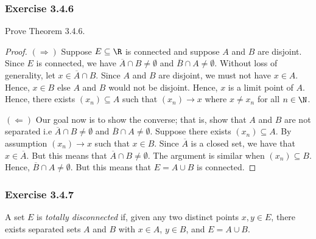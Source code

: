 \subsubsection{Exercise 3.4.6} Prove Theorem 3.4.6.
\begin{proof}
    \( (\Rightarrow) \) Suppose \( E \subseteq \R  \) is connected and suppose \( A  \) and \( B \) are disjoint. Since \( E  \) is connected, we have \( \overline{A} \cap B \neq \emptyset \) and \( \overline{B} \cap A \neq \emptyset \). Without loss of generality, let \( x \in \overline{A}  \cap B  \). Since \( A  \) and \( B  \) are disjoint, we must not have \( x \in A   \). Hence, \( x \in B  \) else \( A  \) and \( B  \) would not be disjoint. Hence, \( x  \) is a limit point of \( A  \). Hence, there exists \( (x_n) \subseteq A  \) such that \( (x_n) \to x  \) where \( x \neq x_n \) for all \( n \in \N \).  

\( (\Leftarrow) \) Our goal now is to show the converse; that is, show that \( A  \) and \( B \) are not separated i.e \( \overline{A} \cap B \neq \emptyset \) and \( \overline{B} \cap A \neq \emptyset \). Suppose there exists \( (x_n) \subseteq A \). By assumption \( (x_n) \to x  \) such that \( x \in B  \). Since \( \overline{A}  \) is a closed set, we have that \( x \in \overline{A} \). But this means that \( \overline{A} \cap B \neq \emptyset\). The argument is similar when \( (x_n) \subseteq B  \). Hence, \( \overline{B} \cap A \neq \emptyset \). But this means that \( E = A \cup B  \) is connected.
\end{proof}

\subsubsection{Exercise 3.4.7} A set \( E \) is \textit{totally disconnected} if, given any two distinct points \( x, y \in E  \), there exists separated sets \( A  \) and \( B  \) with \( x \in A  \), \( y \in B  \), and \( E = A \cup B  \).


